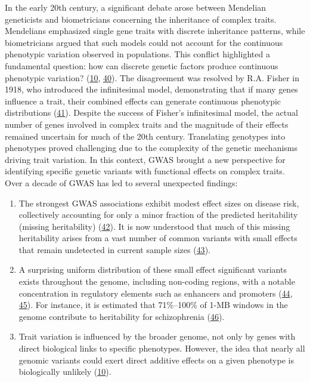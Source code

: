 In the early 20th century, a significant debate arose between Mendelian geneticists and biometricians concerning the inheritance of complex traits.
Mendelians emphasized single gene traits with discrete inheritance patterns, while biometricians argued that such models could not account for the continuous phenotypic variation observed in populations.
This conflict highlighted a fundamental question: how can discrete genetic factors produce continuous phenotypic variation? (\protect\hyperlink{ref-vpIDZCSa}{10}, \protect\hyperlink{ref-15ldVppuv}{40}).
The disagreement was resolved by R.A. Fisher in 1918, who introduced the infinitesimal model, demonstrating that if many genes influence a trait, their combined effects can generate continuous phenotypic distributions (\protect\hyperlink{ref-Qxk70FFV}{41}).
Despite the success of Fisher's infinitesimal model, the actual number of genes involved in complex traits and the magnitude of their effects remained uncertain for much of the 20th century.
Translating genotypes into phenotypes proved challenging due to the complexity of the genetic mechanisms driving trait variation.
In this context, GWAS brought a new perspective for identifying specific genetic variants with functional effects on complex traits.
Over a decade of GWAS has led to several unexpected findings:

\begin{enumerate}
\def\labelenumi{\arabic{enumi}.}
\item
  The strongest GWAS associations exhibit modest effect sizes on disease risk, collectively accounting for only a minor fraction of the predicted heritability (missing heritability) (\protect\hyperlink{ref-RASeYPIy}{42}).
  It is now understood that much of this missing heritability arises from a vast number of common variants with small effects that remain undetected in current sample sizes (\protect\hyperlink{ref-1AOy1zxAv}{43}).
\item
  A surprising uniform distribution of these small effect significant variants exists throughout the genome, including non-coding regions, with a notable concentration in regulatory elements such as enhancers and promoters (\protect\hyperlink{ref-mwTa2RUK}{44}, \protect\hyperlink{ref-lVJVFaaZ}{45}).
  For instance, it is estimated that 71\%--100\% of 1-MB windows in the genome contribute to heritability for schizophrenia (\protect\hyperlink{ref-XvQe1H3A}{46}).
\item
  Trait variation is influenced by the broader genome, not only by genes with direct biological links to specific phenotypes.
  However, the idea that nearly all genomic variants could exert direct additive effects on a given phenotype is biologically unlikely (\protect\hyperlink{ref-vpIDZCSa}{10}).
\end{enumerate}

